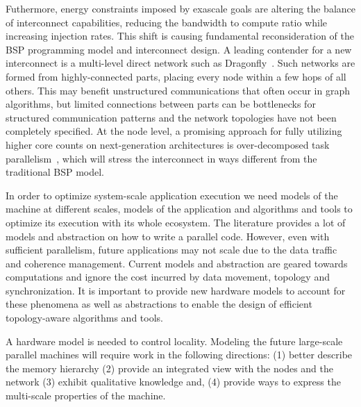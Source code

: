 Futhermore, energy constraints imposed by exascale goals are altering
the balance of interconnect capabilities, reducing the bandwidth to
compute ratio while increasing injection rates.  This shift is causing
fundamental reconsideration of the BSP programming model and
interconnect design.  A leading contender for a new interconnect is a
multi-level direct network such as
Dragonfly~\cite{ibm-percs-network,4556717}.  Such networks are formed
from highly-connected parts, placing every node within a few hops of all
others.  This may benefit unstructured communications that often occur
in graph
algorithms, but limited connections between parts can be bottlenecks for
structured communication patterns and the network topologies have not been 
completely specified.  
At the node level, a promising approach for fully utilizing
higher core counts on next-generation architectures is over-decomposed
task parallelism~\cite{Kale:1993:CPC:165854.165874}, which will stress the interconnect in ways different
from the traditional BSP model.


In order to optimize system-scale application execution we need models
of the machine at different scales, models of the application and algorithms
and tools to optimize its execution with its whole ecosystem. 
The literature provides a lot of models and abstraction on how to write a
parallel code. However, even with sufficient parallelism, future
applications may
not scale due to the data traffic and coherence management. Current models and
abstraction are geared towards computations and ignore the cost incurred by data
movement, topology and synchronization.  It is important to provide new hardware
models to account for these phenomena as well as abstractions to enable the
design of efficient topology-aware algorithms and tools. 

A hardware model is needed to control locality.  Modeling the future large-scale
parallel machines will require work in the following directions: (1) better
describe the memory hierarchy (2) provide an integrated view with the nodes and
the network (3) exhibit qualitative knowledge and, (4) provide ways to express
the multi-scale properties of the machine.

